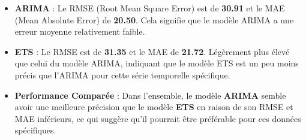 \documentclass[
  letterpaper,
  DIV=11,
  numbers=noendperiod]{scrartcl}
\begin{document}
\begin{itemize}
\item
  \textbf{ARIMA} : Le RMSE (Root Mean Square Error) est de
  \textbf{30.91} et le MAE (Mean Absolute Error) de \textbf{20.50}. Cela
  signifie que le modèle ARIMA a une erreur moyenne relativement faible.
\item
  \textbf{ETS} : Le RMSE est de \textbf{31.35} et le MAE de
  \textbf{21.72}. Légèrement plus élevé que celui du modèle ARIMA,
  indiquant que le modèle ETS est un peu moins précis que l'ARIMA pour
  cette série temporelle spécifique.
\item
  \textbf{Performance Comparée} : Dans l'ensemble, le modèle
  \textbf{ARIMA} semble avoir une meilleure précision que le modèle
  \textbf{ETS} en raison de son RMSE et MAE inférieurs, ce qui suggère
  qu'il pourrait être préférable pour ces données spécifiques.
\end{itemize}
\end{document}
